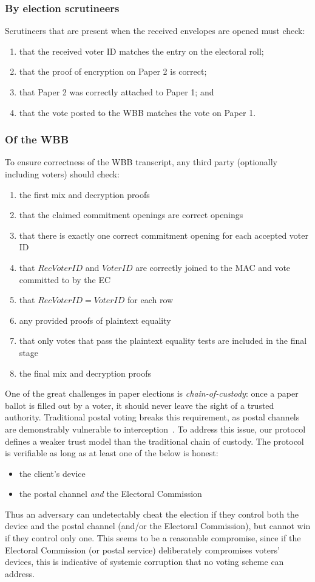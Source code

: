 \documentclass[11pt,twoside,a4paper]{article}
\theoremstyle{definition}
\newcommand{\VoterID}{\mathit{VoterID}}
\newcommand{\receivedvid}{\mathit{RecVoterID}}
\begin{document}
\subsubsection{By election scrutineers}
Scrutineers that are present when the received envelopes are opened must check:
\begin{enumerate}
	\item that the received voter ID matches the entry on the electoral roll;
	\item that the proof of encryption on Paper 2 is correct;
	\item that Paper 2 was correctly attached to Paper 1; and
	\item that the vote posted to the WBB matches the vote on Paper 1.
\end{enumerate}

\subsubsection{Of the WBB}
To ensure correctness of the WBB transcript, any third party (optionally including voters) should check:
\begin{enumerate}
	\item the first mix and decryption proofs
	\item that the claimed commitment openings are correct openings
	\item that there is exactly one correct commitment opening for each accepted voter ID
	\item that $\receivedvid$ and $\VoterID$ are correctly joined to the MAC and vote committed to by the EC
	\item that $\receivedvid = \VoterID$ for each row
	\item any provided proofs of plaintext equality
	\item that only votes that pass the plaintext equality tests are included in the final stage
	\item the final mix and decryption proofs
\end{enumerate}
One of the great challenges in paper elections is \textit{chain-of-custody}: once a paper ballot is filled out by a voter, it should never leave the sight of a trusted authority. Traditional postal voting breaks this requirement, as postal channels are demonstrably vulnerable to interception~\cite{stewart2010losing}. To address this issue, our protocol defines a weaker trust model than the traditional chain of custody. The protocol is verifiable as long as at least one of the below is honest:
\begin{itemize}
    \item the client's device
    \item the postal channel \textit{and} the Electoral Commission
\end{itemize}
Thus an adversary can undetectably cheat the election if they control both the device and the postal channel (and/or the Electoral Commission), but cannot win if they control only one. This seems to be a reasonable compromise, since if the Electoral Commission (or postal service) deliberately compromises voters' devices, this is indicative of systemic corruption that no voting scheme can address.
\end{document}
